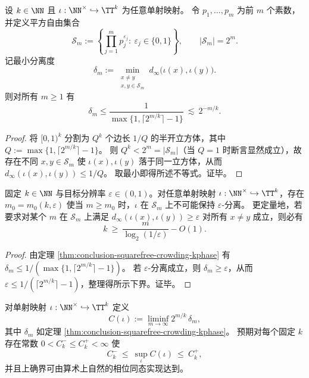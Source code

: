 \begin{theorem}[平方自由素数账本的指数级拥挤]\label{thm:conclusion-squarefree-crowding-kphase}
设 \(k\in\NN\) 且 \(\iota:\NN^\times\hookrightarrow \TT^k\) 为任意单射映射。
令 \(p_1,\dots,p_m\) 为前 \(m\) 个素数，并定义平方自由集合
\[
\mathcal S_m:=\left\{\prod_{j=1}^{m}p_j^{\varepsilon_j}:\ \varepsilon_j\in\{0,1\}\right\},
\qquad
|\mathcal S_m|=2^m.
\]
记最小分离度
\[
\delta_m:=\min_{\substack{x\neq y\\ x,y\in\mathcal S_m}} d_\infty\bigl(\iota(x),\iota(y)\bigr).
\]
则对所有 \(m\ge 1\) 有
\[
\delta_m\le \frac{1}{\max\{1,\lceil 2^{m/k}\rceil-1\}}
\ \lesssim\ 2^{-m/k}.
\]
\end{theorem}

\begin{proof}
将 \([0,1)^k\) 分割为 \(Q^k\) 个边长 \(1/Q\) 的半开立方体，其中 \(Q:=\max\{1,\lceil 2^{m/k}\rceil-1\}\)。
则 \(Q^k<2^m=|\mathcal S_m|\)（当 \(Q=1\) 时断言显然成立），故存在不同 \(x,y\in\mathcal S_m\) 使 \(\iota(x),\iota(y)\) 落于同一立方体，从而
\(
d_\infty(\iota(x),\iota(y))\le 1/Q
\)。
取最小即得所述不等式。证毕。
\end{proof}

\begin{corollary}[固定相位维数与固定分辨率下的可审计性破裂]\label{cor:conclusion-squarefree-audit-breakdown}
固定 \(k\in\NN\) 与目标分辨率 \(\varepsilon\in(0,1)\)。对任意单射映射 \(\iota:\NN^\times\hookrightarrow\TT^k\)，存在 \(m_0=m_0(k,\varepsilon)\) 使当 \(m\ge m_0\) 时，\(\iota\) 在 \(\mathcal S_m\) 上不可能保持 \(\varepsilon\)-分离。
更定量地，若要求对某个 \(m\) 在 \(\mathcal S_m\) 上满足
\(
d_\infty(\iota(x),\iota(y))\ge \varepsilon
\)
对所有 \(x\neq y\) 成立，则必有
\[
k\ \ge\ \frac{m}{\log_2(1/\varepsilon)}-O(1).
\]
\end{corollary}

\begin{proof}
由定理 \ref{thm:conclusion-squarefree-crowding-kphase} 有 \(\delta_m\le 1/(\max\{1,\lceil 2^{m/k}\rceil-1\})\)。
若 \(\varepsilon\)-分离成立，则 \(\delta_m\ge \varepsilon\)，从而 \(\varepsilon\le 1/(\lceil 2^{m/k}\rceil-1)\)，整理得所示下界。证毕。
\end{proof}

\begin{conjecture}[平方自由层上的最优条件数常数]\label{conj:conclusion-squarefree-optimal-conditioning}
对单射映射 \(\iota:\NN^\times\hookrightarrow \TT^k\) 定义
\[
C(\iota):=\liminf_{m\to\infty} 2^{m/k}\,\delta_m,
\]
其中 \(\delta_m\) 如定理 \ref{thm:conclusion-squarefree-crowding-kphase}。
预期对每个固定 \(k\) 存在常数 \(0<C_k^-\le C_k^+<\infty\) 使
\[
C_k^-\ \le\ \sup_{\iota} C(\iota)\ \le\ C_k^+,
\]
并且上确界可由算术上自然的相位同态实现达到。
\end{conjecture}

